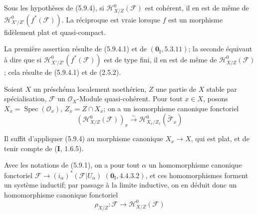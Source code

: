 \begin{corollary}[5.9.5]
\label{IV.2.s5.9.5-fr}
Sous les hypothèses de \textup{(5.9.4)}, si
$\mathcal H^0_{X/Z}(\mathcal F)$ est cohérent, il en est de même de
$\mathcal H^0_{X'/Z'}(f^*(\mathcal F))$. La réciproque est vraie lorsque
$f$ est un morphisme fidèlement plat et quasi-compact.
\end{corollary}

La première assertion résulte de (5.9.4.1) et de $(\mathbf{0}_{\mathrm I},5.3.11)$;
la seconde équivaut à dire que si
$\mathcal H^0_{X'/Z'}(f^*(\mathcal F))$ est de type fini, il en est de même
de $\mathcal H^0_{X/Z}(\mathcal F)$; cela résulte de (5.9.4.1) et de
(2.5.2).

\begin{corollary}[5.9.6]
\label{IV.2.s5.9.6-fr}
Soient $X$ un préschéma localement noethérien, $Z$ une partie de $X$ stable
par spécialisation, $\mathcal F$ un $\mathcal O_X$-Module quasi-cohérent.
Pour tout $x\in X$, posons $X_x=\operatorname{Spec}(\mathcal O_x)$,
$Z_x=Z\cap X_x$; on a un isomorphisme canonique fonctoriel
\begin{equation}
(\mathcal H^0_{X/Z}(\mathcal F))_x
\xrightarrow{\sim}\mathcal H^0_{X_x/Z_x}(\widetilde{\mathcal F}_x)
\tag{5.9.6.1}\label{IV.2.s5.9.6.1-fr}
\end{equation}
\end{corollary}

Il suffit d'appliquer (5.9.4) au morphisme canonique $X_x\to X$, qui est
plat, et de tenir compte de (\textbf{I}, 1.6.5).

\begin{env}[5.9.7]
\label{IV.2.s5.9.7-fr}
Avec les notations de (5.9.1), on a pour tout $\alpha$ un homomorphisme
canonique fonctoriel
$\mathcal F\longrightarrow(i_\alpha)^*(\mathcal F|U_\alpha)$
$(\mathbf{0}_{\mathrm I},4.4.3.2)$,
et ces homomorphismes forment un système inductif; par passage à la limite
inductive, on en déduit donc un homomorphisme canonique fonctoriel
\begin{equation}
\rho_{X/Z}:\mathcal F\longrightarrow\mathcal H^0_{X/Z}(\mathcal F)
\tag{5.9.7.1}\label{IV.2.s5.9.7.1-fr}
\end{equation}
\end{env}

